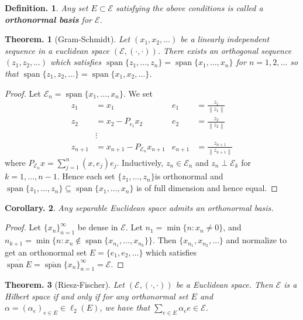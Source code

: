 \documentclass[11pt, a4paper]{memoir}
\newcommand{\norm}[1]{\ensuremath{\left\lVert#1\right\rVert}}
\theoremstyle{change}
\newtheorem{theorem}{Theorem.}[section]
\newtheorem{corollary}[theorem]{Corollary.}
\theoremstyle{plain}
\theoremstyle{nonumberplain}
\newtheorem{definition}{Definition.}
\newtheorem{proof}{Proof}
\DeclareMathOperator{\spn}{span}
\newcommand{\inr}[1]{\ensuremath{\left(#1\right)}}
\numberwithin{equation}{section}
\begin{document}
\begin{definition}
    Any set $E\subset\mathcal{E}$ satisfying the above conditions is called a \textbf{orthonormal basis} for $\mathcal{E}$.
\end{definition}
\begin{theorem}[Gram-Schmidt]
    Let $(x_1,x_2,\ldots)$ be a linearly independent sequence in a euclidean space $(\mathcal{E},\inr{\cdot,\cdot})$.
    There exists an orthogonal sequence $(z_1,z_2,\ldots)$ which satisfies $\spn\{z_1,\ldots,z_n\}=\spn\{x_1,\ldots,x_n\}$ for $n=1,2,\ldots$ so that $\spn\{z_1,z_2,\ldots\}=\spn\{x_1,x_2,\ldots\}$.
\end{theorem}
\begin{proof}
    Let $\mathcal{E}_n=\spn\{x_1,\ldots,x_n\}$.
    We set
    \begin{align*}
        z_1&=x_1 & e_1 &=\frac{z_1}{\norm{z_1}}\\
        z_2&=x_2-P_{\epsilon_1}x_2 & e_2&=\frac{z_2}{\norm{z_2}}\\
           &\vdots\\
        z_{n+1}&=x_{n+1}-P_{\mathcal{E}_n}x_{n+1} & e_{n+1}&=\frac{z_{n+1}}{\norm{z_{n+1}}}
    \end{align*}
    where $P_{\mathcal{E}_n}x=\sum_{j=1}^n\inr{x,e_j}e_j$.
    Inductively, $z_n\in\mathcal{E}_n$ and $z_n\perp\mathcal{E}_k$ for $k=1,\ldots,n-1$.
    Hence each set $\{z_1,\ldots,z_n\}$is orthonormal and $\spn\{z_1,\ldots,z_n\}\subseteq\spn\{x_1,\ldots,x_n\}$ is of full dimension and hence equal.
\end{proof}
\begin{corollary}
    Any separable Euclidean space admits an orthonormal basis.
\end{corollary}
\begin{proof}
    Let $\{x_n\}_{n=1}^\infty$ be dense in $\mathcal{E}$.
    Let $n_1=\min\{n:x_n\neq 0\}$, and $n_{k+1}=\min\{n:x_n\notin\spn\{x_{n_1},\ldots,x_{n_k}\}\}$.
    Then $\{x_{n_1},x_{n_2},\ldots\}$ and normalize to get an orthonormal set $E=\{e_1,e_2,\ldots\}$ which satisfies $\overline{\spn E}=\overline{\spn}\{x_n\}_{n=1}^\infty=\mathcal{E}$.
\end{proof}
\begin{theorem}[Riesz-Fischer]
    Let $(\mathcal{E},\inr{\cdot,\cdot})$ be a Euclidean space.
    Then $\mathcal{E}$ is a Hilbert space if and only if for any orthonormal set $E$ and $\alpha=(\alpha_e)_{e\in E}\in\ell_2(E)$, we have that $\sum_{e\in E}\alpha_ee\in\mathcal{E}$.
\end{theorem}
\end{document}

